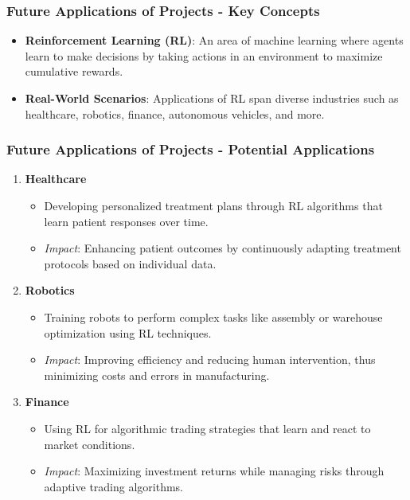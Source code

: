 \documentclass{beamer}
\begin{document}
\begin{frame}[fragile]
    \frametitle{Future Applications of Projects - Key Concepts}
    \begin{itemize}
        \item \textbf{Reinforcement Learning (RL)}: An area of machine learning where agents learn to make decisions by taking actions in an environment to maximize cumulative rewards.
        
        \item \textbf{Real-World Scenarios}: Applications of RL span diverse industries such as healthcare, robotics, finance, autonomous vehicles, and more. 
    \end{itemize}
\end{frame}

\begin{frame}[fragile]
    \frametitle{Future Applications of Projects - Potential Applications}
    \begin{enumerate}
        \item \textbf{Healthcare}
            \begin{itemize}
                \item Developing personalized treatment plans through RL algorithms that learn patient responses over time.
                \item \textit{Impact}: Enhancing patient outcomes by continuously adapting treatment protocols based on individual data.
            \end{itemize}

        \item \textbf{Robotics}
            \begin{itemize}
                \item Training robots to perform complex tasks like assembly or warehouse optimization using RL techniques.
                \item \textit{Impact}: Improving efficiency and reducing human intervention, thus minimizing costs and errors in manufacturing.
            \end{itemize}

        \item \textbf{Finance}
            \begin{itemize}
                \item Using RL for algorithmic trading strategies that learn and react to market conditions.
                \item \textit{Impact}: Maximizing investment returns while managing risks through adaptive trading algorithms.
            \end{itemize}
    \end{enumerate}
\end{frame}
\end{document}

